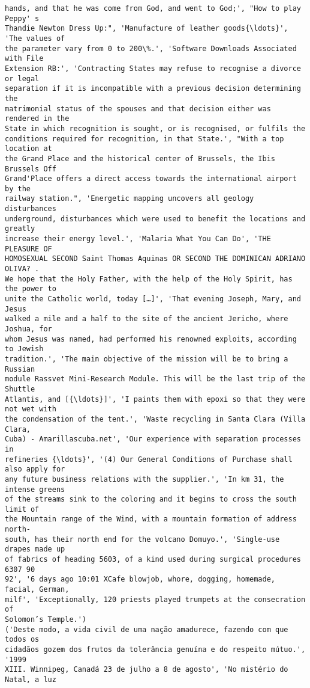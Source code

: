 \documentclass[10pt]{article}
\begin{document}
\begin{Verbatim}[commandchars=\\\{\}]
hands, and that he was come from God, and went to God;', "How to play Peppy' s
Thandie Newton Dress Up:", 'Manufacture of leather goods{\ldots}', 'The values of
the parameter vary from 0 to 200\%.', 'Software Downloads Associated with File
Extension RB:', 'Contracting States may refuse to recognise a divorce or legal
separation if it is incompatible with a previous decision determining the
matrimonial status of the spouses and that decision either was rendered in the
State in which recognition is sought, or is recognised, or fulfils the
conditions required for recognition, in that State.', "With a top location at
the Grand Place and the historical center of Brussels, the Ibis Brussels Off
Grand'Place offers a direct access towards the international airport by the
railway station.", 'Energetic mapping uncovers all geology disturbances
underground, disturbances which were used to benefit the locations and greatly
increase their energy level.', 'Malaria What You Can Do', 'THE PLEASURE OF
HOMOSEXUAL SECOND Saint Thomas Aquinas OR SECOND THE DOMINICAN ADRIANO OLIVA? .
We hope that the Holy Father, with the help of the Holy Spirit, has the power to
unite the Catholic world, today […]', 'That evening Joseph, Mary, and Jesus
walked a mile and a half to the site of the ancient Jericho, where Joshua, for
whom Jesus was named, had performed his renowned exploits, according to Jewish
tradition.', 'The main objective of the mission will be to bring a Russian
module Rassvet Mini-Research Module. This will be the last trip of the Shuttle
Atlantis, and [{\ldots}]', 'I paints them with epoxi so that they were not wet with
the condensation of the tent.', 'Waste recycling in Santa Clara (Villa Clara,
Cuba) - Amarillascuba.net', 'Our experience with separation processes in
refineries {\ldots}', '(4) Our General Conditions of Purchase shall also apply for
any future business relations with the supplier.', 'In km 31, the intense greens
of the streams sink to the coloring and it begins to cross the south limit of
the Mountain range of the Wind, with a mountain formation of address north-
south, has their north end for the volcano Domuyo.', 'Single-use drapes made up
of fabrics of heading 5603, of a kind used during surgical procedures 6307 90
92', '6 days ago 10:01 XCafe blowjob, whore, dogging, homemade, facial, German,
milf', 'Exceptionally, 120 priests played trumpets at the consecration of
Solomon’s Temple.')
('Deste modo, a vida civil de uma nação amadurece, fazendo com que todos os
cidadãos gozem dos frutos da tolerância genuína e do respeito mútuo.', '1999
XIII. Winnipeg, Canadá 23 de julho a 8 de agosto', 'No mistério do Natal, a luz

\end{Verbatim}
\end{document}
